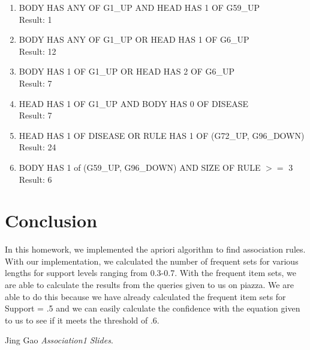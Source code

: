 \documentclass[12pt]{article}
\begin{document}
\begin{enumerate}
	\item  BODY HAS ANY OF G1\_UP AND HEAD HAS 1 OF G59\_UP \\
	Result: 1\\
	\item  BODY HAS ANY OF G1\_UP OR HEAD HAS 1 OF G6\_UP \\
	Result: 12\\
	\item  BODY HAS 1 OF G1\_UP OR HEAD HAS 2 OF G6\_UP \\
	Result: 7\\
	\item  HEAD HAS 1 OF G1\_UP AND BODY HAS 0 OF DISEASE \\
	Result: 7\\
	\item  HEAD HAS 1 OF DISEASE OR RULE HAS 1 OF (G72\_UP, G96\_DOWN) \\
	Result: 24\\
	\item  BODY HAS 1 of (G59\_UP, G96\_DOWN) AND SIZE OF RULE $>=$ 3 \\
	Result: 6\\
\end{enumerate}
\section*{Conclusion}

In this homework, we implemented the apriori algorithm to find association rules. With our implementation, we calculated the number of frequent sets for various lengths for support levels ranging from 0.3-0.7. With the frequent item sets, we are able to calculate the results from the queries given to us on piazza. We are able to do this because we have already calculated the frequent item sets for Support = .5 and we can easily calculate the confidence with the equation given to us to see if it meets the threshold of .6. 






\begin{thebibliography}{9}
	Jing Gao
	\textit{Association1 Slides}. 

\end{thebibliography}
\end{document}
